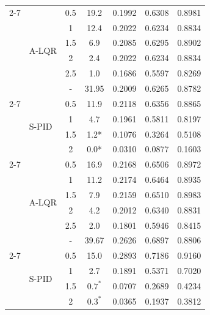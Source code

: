 \documentclass{article}
\theoremstyle{plain}
\theoremstyle{definition}
\theoremstyle{remark}
\begin{document}
\begin{table}[t]
{\begin{threeparttable}
\begin{tabular}{llc|c|ccc}
    \cmidrule(lr){2-7}
    & \multirow{6}{*}{A-LQR} & 0.5 & 19.2 & 0.1992 & 0.6308 & 0.8981 \\ %
    & & 1 & 12.4 & 0.2022 & 0.6234 & 0.8834 \\ %
    & & 1.5 & 6.9 & 0.2085 & 0.6295 & 0.8902 \\ %
    & & 2 & 2.4 & 0.2022 & 0.6234 & 0.8834 \\
    & & 2.5 & 1.0 & 0.1686 & 0.5597 &  0.8269 \\
    
    \midrule
    & Original & - & 31.95 & 0.2009 & 0.6265 & 0.8782 \\
    
    \cmidrule(lr){2-7}
    \multirow{9}{*}{\rotatebox{90}{Qwen-2.5-3B}} 
        & \multirow{4}{*}{S-PID} & 0.5 & 11.9 & 0.2118 & 0.6356 & 0.8865 \\
        & & 1 & 4.7 & 0.1961 & 0.5811 & 0.8197 \\
        & & 1.5 & 1.2* & 0.1076 & 0.3264 & 0.5108 \\ 
        & & 2 & 0.0* & 0.0310 & 0.0877 & 0.1603 \\
        
    \cmidrule(lr){2-7}
    & \multirow{6}{*}{A-LQR} & 0.5 & 16.9 & 0.2168 & 0.6506 & 0.8972 \\ %
    & & 1 & 11.2 & 0.2174 & 0.6464 & 0.8935 \\ 
    & & 1.5 & 7.9 & 0.2159 & 0.6510 & 0.8983 \\  
    & & 2 & 4.2 & 0.2012 & 0.6340 & 0.8831 \\
    & & 2.5 & 2.0 & 0.1801 & 0.5946 &  0.8415 \\




    \midrule
    & Original & - & 39.67 & 0.2626 & 0.6897 & 0.8806 \\
    
    \cmidrule(lr){2-7}
    \multirow{9}{*}{\rotatebox{90}{Llama-3-8B}} 
& \multirow{4}{*}{S-PID} & 0.5 & 15.0 & 0.2893 & 0.7186 & 0.9160 \\
& & 1 & 2.7 & 0.1891 & 0.5371 & 0.7020 \\
& & 1.5 & $0.7^*$ & 0.0707 & 0.2689 & 0.4234 \\
& & 2 & $0.3^*$ & 0.0365 & 0.1937 & 0.3812 \\
        

\end{tabular}
\end{threeparttable}}
\end{table}
\end{document}
